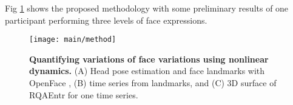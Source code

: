 \documentclass[12pt]{article}
\begin{document}
Fig \ref{fig:method} shows the proposed methodology with 
some preliminary results of one participant performing three
levels of face expressions. 


\begin{figure}
\centering
\texttt{[image: main/method]}
    \caption{
	{\bf Quantifying variations of face variations using nonlinear dynamics.}
	(A) Head pose estimation and face landmarks with OpenFace \cite{baltrusaitis2018},
	(B) time series from landmarks, and
	(C) 3D surface of RQAEntr for one time series.
        }
\label{fig:method}
\end{figure}








\end{document}

